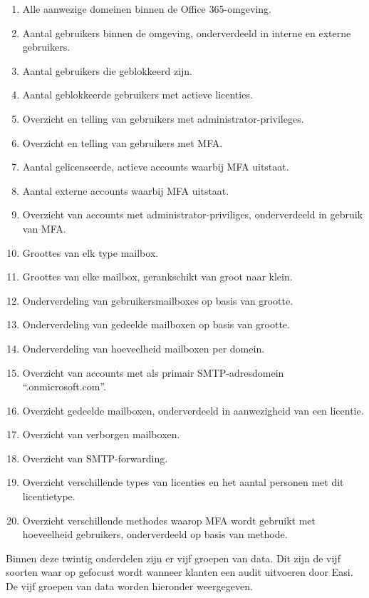 \begin{enumerate}
    \item Alle aanwezige domeinen binnen de Office 365-omgeving.
    \item Aantal gebruikers binnen de omgeving, onderverdeeld in interne en externe gebruikers.
    \item Aantal gebruikers die geblokkeerd zijn.
    \item Aantal geblokkeerde gebruikers met actieve licenties.
    \item Overzicht en telling van gebruikers met administrator-privileges.
    \item Overzicht en telling van gebruikers met \ac{MFA}.
    \item Aantal gelicenseerde, actieve accounts waarbij \ac{MFA} uitstaat.
    \item Aantal externe accounts waarbij \ac{MFA} uitstaat.
    \item Overzicht van accounts met administrator-priviliges, onderverdeeld in gebruik van \ac{MFA}.
    \item Groottes van elk type mailbox.
    \item Groottes van elke mailbox, gerankschikt van groot naar klein.
    \item Onderverdeling van gebruikersmailboxes op basis van grootte.
    \item Onderverdeling van gedeelde mailboxen op basis van grootte.
    \item Onderverdeling van hoeveelheid mailboxen per domein.
    \item Overzicht van accounts met als primair \Ac{SMTP}-adresdomein “.onmicrosoft.com”.
    \item Overzicht gedeelde mailboxen, onderverdeeld in aanwezigheid van een licentie.
    \item Overzicht van verborgen mailboxen.
    \item Overzicht van \ac{SMTP}-forwarding.
    \item Overzicht verschillende types van licenties en het aantal personen met dit licentietype.
    \item Overzicht verschillende methodes waarop \ac{MFA} wordt gebruikt met hoeveelheid gebruikers, onderverdeeld op basis van methode.
\end{enumerate}

Binnen deze twintig onderdelen zijn er vijf groepen van data. Dit zijn de vijf soorten waar op gefocust wordt wanneer klanten een audit uitvoeren door Easi. De vijf groepen van data worden hieronder weergegeven. 

